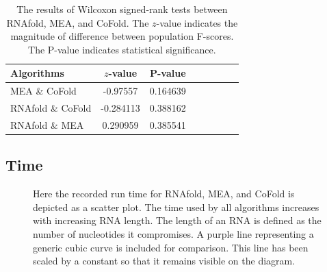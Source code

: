 \documentclass[12pt, a4paper]{article}
\begin{document}
\begin{table}
\centering
\begin{tabular}{l*{6}{c}r}
Algorithms	& $z$-value & P-value \\
\hline 
MEA \& CoFold &  -0.97557    &    0.164639   \\
RNAfold \& CoFold &  -0.284113    &    0.388162  \\
RNAfold \& MEA &  0.290959   &    0.385541  \\
\end{tabular}
\caption{The results of Wilcoxon signed-rank tests between RNAfold, MEA, and CoFold. The $z$-value indicates the magnitude of difference between population F-scores. The P-value indicates statistical significance.}
\label{tab:wilcoxon_large}
\end{table}


\subsection{Time}

\begin{figure}
\begin{center}
\end{center}
\caption{Here the recorded run time for RNAfold, MEA, and CoFold is depicted as a scatter plot. The time used by all algorithms increases with increasing RNA length. The length of an RNA is defined as the number of nucleotides it compromises. A purple line representing a generic cubic curve is included for comparison. This line has been scaled by a constant so that it remains visible on the diagram.}
\label{fig:timegraph}
\end{figure}
\end{document}
